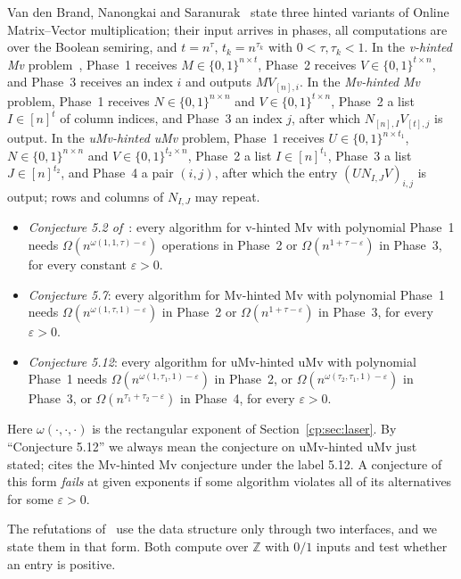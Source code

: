 \documentclass[11pt]{article}
\theoremstyle{definition}
\theoremstyle{remark}
\providecommand{\eps}{\varepsilon}
\providecommand{\Z}{\mathbb{Z}}
\begin{document}
Van den Brand, Nanongkai and Saranurak~\cite{BNS19} state three hinted variants of Online Matrix--Vector multiplication; their input arrives in phases, all computations are over the Boolean semiring, and $t=n^\tau$, $t_k=n^{\tau_k}$ with $0<\tau,\tau_k<1$. In the \emph{v-hinted Mv} problem~\cite[Definition~5.1]{BNS19}, Phase~1 receives $M\in\{0,1\}^{n\times t}$, Phase~2 receives $V\in\{0,1\}^{t\times n}$, and Phase~3 receives an index $i$ and outputs $MV_{[n],i}$. In the \emph{Mv-hinted Mv} problem, Phase~1 receives $N\in\{0,1\}^{n\times n}$ and $V\in\{0,1\}^{t\times n}$, Phase~2 a list $I\in[n]^t$ of column indices, and Phase~3 an index $j$, after which $N_{[n],I}V_{[t],j}$ is output. In the \emph{uMv-hinted uMv} problem, Phase~1 receives $U\in\{0,1\}^{n\times t_1}$, $N\in\{0,1\}^{n\times n}$ and $V\in\{0,1\}^{t_2\times n}$, Phase~2 a list $I\in[n]^{t_1}$, Phase~3 a list $J\in[n]^{t_2}$, and Phase~4 a pair $(i,j)$, after which the entry $(UN_{I,J}V)_{i,j}$ is output; rows and columns of $N_{I,J}$ may repeat.
\begin{itemize}
\item \emph{Conjecture 5.2 of~\cite{BNS19}}: every algorithm for v-hinted Mv with polynomial Phase~1 needs $\Omega(n^{\omega(1,1,\tau)-\eps})$ operations in Phase~2 or $\Omega(n^{1+\tau-\eps})$ in Phase~3, for every constant $\eps>0$.
\item \emph{Conjecture 5.7}: every algorithm for Mv-hinted Mv with polynomial Phase~1 needs $\Omega(n^{\omega(1,\tau,1)-\eps})$ in Phase~2 or $\Omega(n^{1+\tau-\eps})$ in Phase~3, for every $\eps>0$.
\item \emph{Conjecture 5.12}: every algorithm for uMv-hinted uMv with polynomial Phase~1 needs $\Omega(n^{\omega(1,\tau_1,1)-\eps})$ in Phase~2, or $\Omega(n^{\omega(\tau_2,\tau_1,1)-\eps})$ in Phase~3, or $\Omega(n^{\tau_1+\tau_2-\eps})$ in Phase~4, for every $\eps>0$.
\end{itemize}
Here $\omega(\cdot,\cdot,\cdot)$ is the rectangular exponent of Section~\ref{cp:sec:laser}. By ``Conjecture 5.12'' we always mean the conjecture on uMv-hinted uMv just stated; \cite[Corollary~5.10]{BNS19} cites the Mv-hinted Mv conjecture under the label 5.12. A conjecture of this form \emph{fails} at given exponents if some algorithm violates all of its alternatives for some $\eps>0$.

The refutations of~\cite{v2} use the data structure only through two interfaces, and we state them in that form. Both compute over $\Z$ with $0/1$ inputs and test whether an entry is positive.
\end{document}
